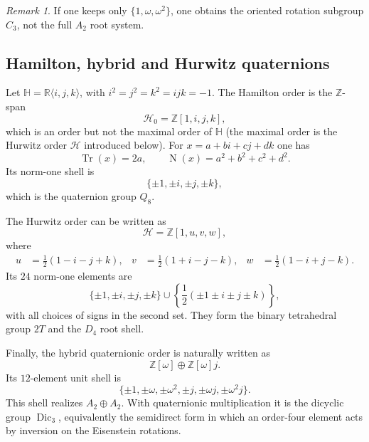 \documentclass[12pt,oneside,english]{amsart}
\numberwithin{equation}{section}
\numberwithin{figure}{section}
\numberwithin{table}{section}
\theoremstyle{plain}
\theoremstyle{definition}
\theoremstyle{remark}
\newtheorem{remark}[theorem]{Remark}
\newcommand{\ZZ}{\mathbb Z}
\newcommand{\RR}{\mathbb R}
\newcommand{\HH}{\mathbb H}
\newcommand{\Tr}{\operatorname{Tr}}
\newcommand{\Norm}{\operatorname{N}}
\begin{document}
\begin{remark}
If one keeps only \(\{1,\omega,\omega^2\}\), one obtains the oriented rotation subgroup \(C_3\), not the full \(A_2\) root system.
\end{remark}

\subsection{Hamilton, hybrid and Hurwitz quaternions}

Let \(\HH=\RR\langle i,j,k\rangle\), with \(i^2=j^2=k^2=ijk=-1\). The Hamilton order is the \(\ZZ\)-span
\begin{equation}
\mathcal H_0=\ZZ[1,i,j,k],
\label{eq:hamilton-order}
\end{equation}
which is an order but not the maximal order of \(\HH\) (the maximal order is the Hurwitz order \(\mathcal H\) introduced below).
For \(x=a+bi+cj+dk\) one has
\begin{equation}
\Tr(x)=2a,\qquad \Norm(x)=a^2+b^2+c^2+d^2.
\label{eq:hamilton-trace-norm}
\end{equation}
Its norm-one shell is
\begin{equation}
\{\pm1,\pm i,\pm j,\pm k\},
\label{eq:hamilton-units}
\end{equation}
which is the quaternion group \(Q_8\).

The Hurwitz order can be written as
\begin{equation}
\mathcal H=\ZZ[1,u,v,w],
\label{eq:hurwitz-order}
\end{equation}
where
\begin{align}
u&=\frac{1}{2}(1-i-j+k),&
v&=\frac{1}{2}(1+i-j-k),&
w&=\frac{1}{2}(1-i+j-k).
\label{eq:hurwitz-basis}
\end{align}
Its \(24\) norm-one elements are
\begin{equation}
\{\pm1,\pm i,\pm j,\pm k\}\cup
\left\{\frac{1}{2}(\pm1\pm i\pm j\pm k)\right\},
\label{eq:hurwitz-units}
\end{equation}
with all choices of signs in the second set. They form the binary tetrahedral group \(2T\) and the \(D_4\) root shell.

Finally, the hybrid quaternionic order is naturally written as
\begin{equation}
\ZZ[\omega]\oplus \ZZ[\omega]j.
\label{eq:hybrid-order}
\end{equation}
Its \(12\)-element unit shell is
\begin{equation}
\{\pm1,\pm\omega,\pm\omega^2,\pm j,\pm\omega j,\pm\omega^2j\}.
\label{eq:hybrid-units}
\end{equation}
This shell realizes \(A_2\oplus A_2\). With quaternionic multiplication it is the dicyclic group \(\operatorname{Dic}_3\), equivalently the semidirect form in which an order-four element acts by inversion on the Eisenstein rotations.
\end{document}
